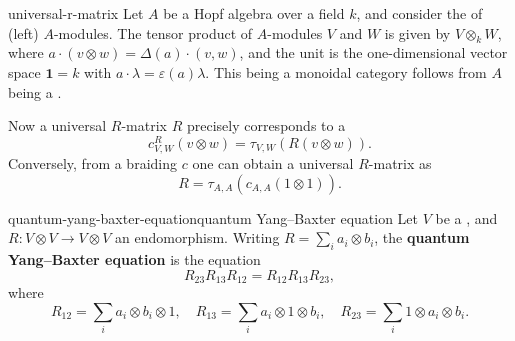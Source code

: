 \begin{example}{universal-r-matrix}
    Let $A$ be a Hopf algebra over a field $k$, and consider the  of (left) $A$-modules. The tensor product of $A$-modules $V$ and $W$ is given by $V \otimes_k W$, where $a \cdot (v \otimes w) = \Delta(a) \cdot (v, w)$, and the unit is the one-dimensional vector space $\textbf{1} = k$ with $a \cdot \lambda = \varepsilon(a) \lambda$. This being a monoidal category follows from $A$ being a .
    
    Now a universal $R$-matrix $R$ precisely corresponds to a 
    \[ c_{V, W}^R(v \otimes w) = \tau_{V, W}(R (v \otimes w)) . \]
    Conversely, from a braiding $c$ one can obtain a universal $R$-matrix as
    \[ R = \tau_{A, A}(c_{A, A}(1 \otimes 1)) . \]
\end{example}

\begin{topic}{quantum-yang-baxter-equation}{quantum Yang--Baxter equation}
    Let $V$ be a , and $R \colon V \otimes V \to V \otimes V$ an endomorphism. Writing $R = \sum_i a_i \otimes b_i$, the \textbf{quantum Yang--Baxter equation} is the equation
    \[ R_{23} R_{13} R_{12} = R_{12} R_{13} R_{23} , \]
    where
    \[ R_{12} = \sum_i a_i \otimes b_i \otimes 1, \quad R_{13} = \sum_i a_i \otimes 1 \otimes b_i, \quad R_{23} = \sum_i 1 \otimes a_i \otimes b_i . \]
\end{topic}

